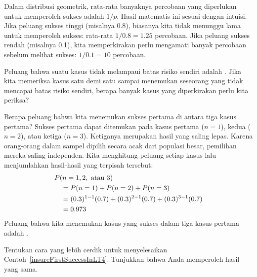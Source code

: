 Dalam distribusi geometrik, rata-rata banyaknya percobaan yang diperlukan
untuk memperoleh sukses adalah $1/p$. Hasil matematis ini sesuai dengan
intuisi. Jika peluang sukses tinggi (misalnya 0.8), biasanya kita tidak
menunggu lama untuk memperoleh sukses: rata-rata $1/0.8 = 1.25$ percobaan.
Jika peluang sukses rendah (misalnya 0.1), kita memperkirakan perlu
mengamati banyak percobaan sebelum melihat sukses: $1/0.1 = 10$ percobaan.

\begin{exercisewrap}
\begin{nexercise}
Peluang bahwa suatu kasus tidak melampaui batas risiko sendiri adalah
\insureSprob{}. Jika kita memeriksa kasus satu demi satu sampai menemukan
seseorang yang tidak mencapai batas risiko sendiri, berapa banyak kasus
yang diperkirakan perlu kita periksa?\footnotemark{}
\end{nexercise}
\end{exercisewrap}

\begin{examplewrap}
\begin{nexample}{Berapa peluang bahwa kita menemukan sukses pertama
    di antara tiga kasus pertama?}
  \label{insureFirstSuccessInLT4}%
  Sukses pertama dapat ditemukan pada kasus pertama ($n=1$), kedua
  ($n=2$), atau ketiga ($n=3$). Ketiganya merupakan hasil yang saling
  lepas. Karena orang-orang dalam sampel dipilih secara acak dari populasi
  besar, pemilihan mereka saling independen. Kita menghitung peluang
  setiap kasus lalu menjumlahkan hasil-hasil yang terpisah tersebut:
  \begin{align*}
  &P(n=1, 2, \text{ atau }3) \\
    & \quad = P(n=1)+P(n=2)+P(n=3) \\
    & \quad = (0.3{})^{1-1}(0.7{})
        + (0.3{})^{2-1}(0.7{})
        + (0.3{})^{3-1}(0.7{}) \\
    & \quad = 0.973{}
  \end{align*}
  Peluang bahwa kita menemukan kasus yang sukses dalam tiga kasus pertama
  adalah \insureCDistC{}.
\end{nexample}
\end{examplewrap}

\begin{exercisewrap}
\begin{nexercise}
Tentukan cara yang lebih cerdik untuk menyelesaikan
Contoh~\ref{insureFirstSuccessInLT4}. Tunjukkan bahwa Anda memperoleh hasil
yang sama.\footnotemark{}
\end{nexercise}
\end{exercisewrap}

